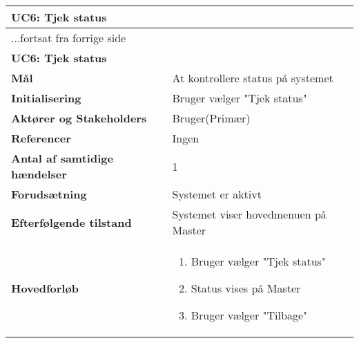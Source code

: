 \begin{center} \centering \label{UC6}
	\begin{longtable}{|p{5cm}|p{9cm}|}  %
	\hline
		\multicolumn{2}{|l|}{\textbf{UC6: Tjek status}} \\\hline %
		\endfirsthead
		
		\multicolumn{2}{l}{...fortsat fra forrige side} \\ \hline %
		\multicolumn{2}{|l|}{\textbf{UC6: Tjek status}} \\\hline %
		\endhead	
		
		\textbf{Mål}								&At kontrollere status på systemet			\\\hline
		\textbf{Initialisering}					&Bruger vælger "Tjek status"		\\\hline
		\textbf{Aktører og Stakeholders}			&Bruger(Primær)					\\\hline
		\textbf{Referencer}						&Ingen							\\\hline
		\textbf{Antal af samtidige hændelser}	&1								\\\hline
		\textbf{Forudsætning}					&Systemet er aktivt				\\\hline
		\textbf{Efterfølgende tilstand}			&Systemet viser hovedmenuen på Master			\\\hline
		\textbf{Hovedforløb}					
			&\begin{enumerate}
	
				\item Bruger vælger "Tjek status"
				
				\item Status vises på Master
				
				\item Bruger vælger "Tilbage"
	
			\end{enumerate}\\\hline
	\end{longtable} 
\end{center}

